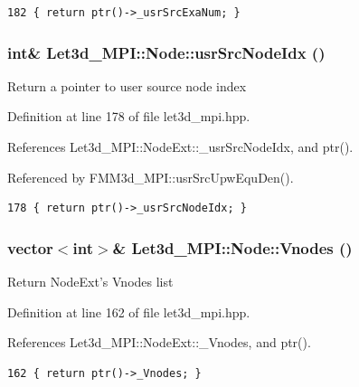 \footnotesize\begin{verbatim}182 { return ptr()->_usrSrcExaNum; }
\end{verbatim}\normalsize 


\subsubsection{\setlength{\rightskip}{0pt plus 5cm}int\& Let3d\_\-MPI::Node::usr\-Src\-Node\-Idx ()\hspace{0.3cm}{\tt  [inline]}}\label{classLet3d__MPI_1_1Node_6afd33b520400599080c70f8e0513f35_6afd33b520400599080c70f8e0513f35}


Return a pointer to user source node index 

Definition at line 178 of file let3d\_\-mpi.hpp.

References Let3d\_\-MPI::Node\-Ext::\_\-usr\-Src\-Node\-Idx, and ptr().

Referenced by FMM3d\_\-MPI::usr\-Src\-Upw\-Equ\-Den().

\footnotesize\begin{verbatim}178 { return ptr()->_usrSrcNodeIdx; }
\end{verbatim}\normalsize 


\subsubsection{\setlength{\rightskip}{0pt plus 5cm}vector$<$int$>$\& Let3d\_\-MPI::Node::Vnodes ()\hspace{0.3cm}{\tt  [inline]}}\label{classLet3d__MPI_1_1Node_0ac14aa83b42d181255da58425b5509b_0ac14aa83b42d181255da58425b5509b}


Return Node\-Ext's Vnodes list 

Definition at line 162 of file let3d\_\-mpi.hpp.

References Let3d\_\-MPI::Node\-Ext::\_\-Vnodes, and ptr().

\footnotesize\begin{verbatim}162 { return ptr()->_Vnodes; }
\end{verbatim}\normalsize 


